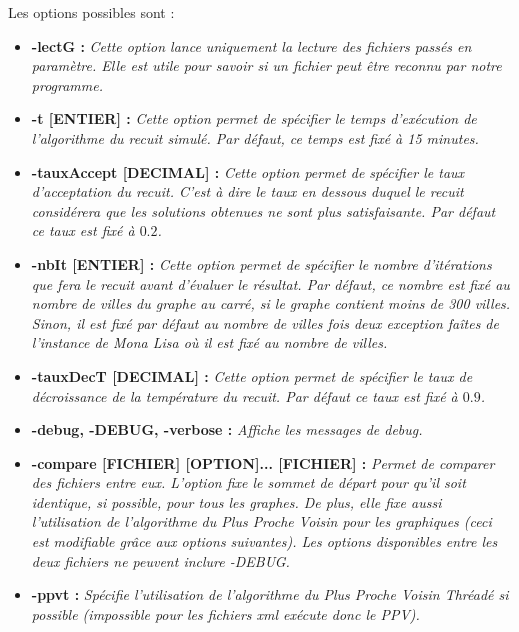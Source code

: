 \documentclass{article}
\begin{document}
Les options possibles sont :\smallskip
\begin{itemize}
\item \textbf{-lectG :} \emph{Cette option lance uniquement la lecture des fichiers passés en paramètre. Elle est utile pour savoir si un fichier peut être reconnu par notre programme.}\smallskip

\item \textbf{-t [ENTIER] :} \emph{Cette option permet de spécifier le temps d'exécution de l'algorithme du recuit simulé. Par défaut, ce temps est fixé à 15 minutes.}\smallskip

\item \textbf{-tauxAccept [DECIMAL] :} \emph{Cette option permet de spécifier le taux d'acceptation du recuit. C'est à dire le taux en dessous duquel le recuit considérera que les solutions obtenues ne sont plus satisfaisante. Par défaut ce taux est fixé à $0.2$.}\smallskip

\item \textbf{-nbIt [ENTIER] :} \emph{Cette option permet de spécifier le nombre d'itérations que fera le recuit avant d'évaluer le résultat.
Par défaut, ce nombre est fixé au nombre de villes du graphe au carré, si le graphe contient moins de 300 villes.
Sinon, il est fixé par défaut au nombre de villes fois deux exception faîtes de l'instance de Mona Lisa où il est fixé au nombre de villes.}\smallskip

\item \textbf{-tauxDecT [DECIMAL] :} \emph{Cette option permet de spécifier le taux de décroissance de la température du recuit. Par défaut ce taux est fixé à $0.9$.}\smallskip

\item \textbf{-debug, -DEBUG, -verbose :} \emph{Affiche les messages de debug.}\smallskip

\item \textbf{-compare [FICHIER] [OPTION]... [FICHIER] :} \emph{
Permet de comparer des fichiers entre eux. L'option fixe le sommet de départ pour qu'il soit identique, si possible, pour tous les graphes.
De plus, elle fixe aussi l'utilisation de l'algorithme du Plus Proche Voisin pour les graphiques (ceci est modifiable grâce aux options suivantes).
Les options disponibles entre les deux fichiers ne peuvent inclure -DEBUG.}\smallskip

\item \textbf{-ppvt :} \emph{Spécifie l'utilisation de l'algorithme du Plus Proche Voisin Thréadé si possible (impossible pour les fichiers xml exécute donc le PPV).}\smallskip


\end{itemize}
\end{document}
